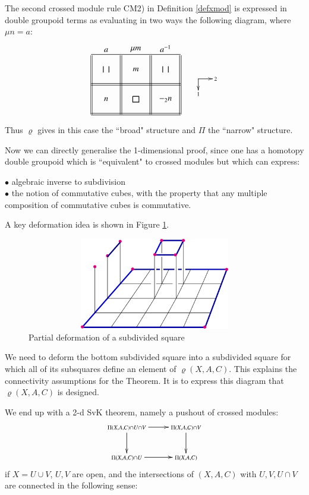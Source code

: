 \documentclass{elsarticle}
\makeatletter
\newcommand{\xdirects}[2]{\def\objectstyle{\scriptstyle}  \objectmargin={0pt}
\xy
(0,0)*+{}="a",(0,-6)*+{\rule{0em}{1.5ex}#2}="b",(7,0)*+{\;#1}="c"
\ar@{->} "a";"b" \ar @{->}"a";"c" \endxy }
\newcommand{\vv}{\mbox{\rule{0.08em}{1.7ex}\hspace{0.6em}\rule{0.08em}{1.7ex}}}
\newcommand{\sq}{\mbox{\rule{0.08em}{1.7ex}\hspace{-0.00em}\rule{0.7em}{0.2ex}\hspace{-0.7em}\rule[1.54ex]{0.7em}{0.2ex}\hspace{-0.03em}\rule{0.08em}{1.7ex}}}
\def\rho{\varrho}
\def\xybiglabels{\def\labelstyle{\textstyle}}
\makeatother
\begin{document}
The second crossed module rule CM2) in Definition \ref{defxmod} is expressed in double groupoid terms as evaluating in two ways the following  diagram, where $\mu n =a$:
\begin{equation}\label{eq:CM2} \xybiglabels
  \vcenter{\xymatrix@M=0pt@=3pc{\ar @{-}[rrr] \ar @{=} [dd]\ar @{} [r] ^a \ar @{}[dr]|{\vv} &\ar @{=} [dd] \ar @{} [r]^{\mu m} \ar @{}[dr]|m &\ar @{=} [dd] \ar @{}[dr]|{\vv}\ar @{} [r] ^{a^{-1}} & \ar @{=}[dd]\\
  \ar @{=} [rrr] \ar @{}[dr]|{n} &\ar @{} [dr]|{\sq}& \ar @{}[dr]|{-_2n}& \\
  \ar @{=} [rrr]&& & }} \qquad \xdirects{2}{1}
\end{equation}




Thus $\rho$  gives in this case the ``broad" structure and $\Pi$  the ``narrow" structure.

Now we can directly generalise the 1-dimensional proof, since one has a homotopy double
groupoid which is ``equivalent"  to crossed modules but which can express:


\noindent $\bullet$ algebraic inverse to subdivision\\
$\bullet$ the notion of  commutative cubes, with the property  that any multiple composition of commutative cubes is commutative.

A key deformation idea is shown in Figure \ref{fig:deform}.
\begin{figure}[h]
\centering
\includegraphics[width=12cm,height=4cm]{deformfine.png}
\caption{Partial deformation of a subdivided square}\label{fig:deform}
\end{figure}
We need to deform the bottom subdivided square into a subdivided square for which all of its
subsquares define an element of $\rho(X, A, C)$. This explains the connectivity assumptions for the
Theorem. It is to express this diagram that $\rho(X, A, C)$ is designed.

We end up with a 2-d SvK theorem, namely a pushout of crossed modules:
\begin{equation}\label{equ:2push}
  \vcenter{\xymatrix{ \Pi(X,A,C) \cap U \cap V \ar [r] \ar [d] & \Pi(X,A,C) \cap V \ar [d] \\
  \Pi(X,A,C) \cap U \ar [r] & \Pi(X,A,C) }}
\end{equation}
if $X = U \cup V$, $U, V$  are  open, and the intersections of $(X,A,C)$ with $U,V, U \cap V$ are  connected in the following sense:
\end{document}
